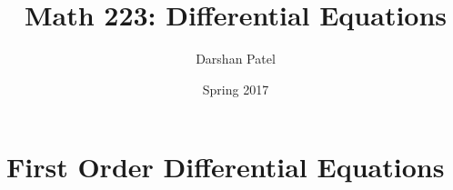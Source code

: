 \documentclass[12pt]{article}
\begin{document}
\theoremstyle{definition}
\newtheorem{theorem}{Theorem}[section]
\newtheorem{definition}{Definition}[section]
\newtheorem{example}{Example}[section]

\newcommand{\dy}{\frac{dy}{dt}}
\newcommand{\ddy}{\frac{d^2y}{dt^2}} 
\newcommand{\sumzinf}{\sum_{n = 0}^{\infty}}

\title{Math 223: Differential Equations}
\author{Darshan Patel}
\date{Spring 2017}
\maketitle

\tableofcontents

\section{First Order Differential Equations} 
\end{document}
